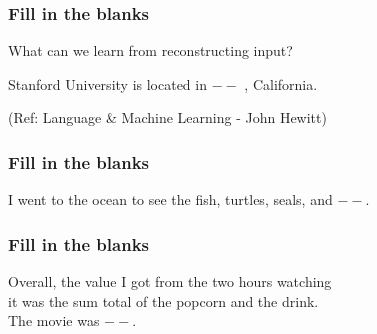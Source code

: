 \begin{frame}[fragile]\frametitle{Fill in the blanks}

What can we learn from reconstructing input?

\begin{center}
Stanford University is located in $--$	, California.
\end{center}		  

{\tiny (Ref: Language \& Machine Learning - John Hewitt)}
\end{frame}







\begin{frame}[fragile]\frametitle{Fill in the blanks}

\begin{center}
I went to the ocean to see the fish, turtles, seals, and $--$.
\end{center}		  

\end{frame}

\begin{frame}[fragile]\frametitle{Fill in the blanks}

\begin{center}
Overall, the value I got from the two hours watching \\ it was the sum total of the popcorn and the drink.\\
The movie was  $--$.
\end{center}		  

\end{frame}

